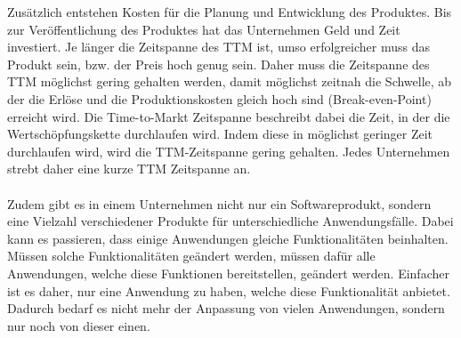 Zusätzlich entstehen Kosten für die Planung und Entwicklung des Produktes. Bis zur Veröffentlichung des Produktes hat das Unternehmen Geld und Zeit investiert. Je länger die Zeitspanne des TTM ist, umso erfolgreicher muss das Produkt sein, bzw. der Preis hoch genug sein. Daher muss die Zeitspanne des TTM möglichst gering gehalten werden, damit möglichst zeitnah die Schwelle, ab der die Erlöse und die Produktionskosten gleich hoch sind (Break-even-Point) erreicht wird. Die Time-to-Markt Zeitspanne beschreibt dabei die Zeit, in der die Wertschöpfungskette durchlaufen wird. Indem diese in möglichst geringer Zeit durchlaufen wird, wird die TTM-Zeitspanne gering gehalten. Jedes Unternehmen strebt daher eine kurze TTM Zeitspanne an.
\\\\
Zudem gibt es in einem Unternehmen nicht nur ein Softwareprodukt, sondern eine Vielzahl verschiedener Produkte für unterschiedliche Anwendungsfälle. Dabei kann es passieren, dass einige Anwendungen gleiche Funktionalitäten beinhalten. Müssen solche Funktionalitäten geändert werden, müssen dafür alle Anwendungen, welche diese Funktionen bereitstellen, geändert werden. Einfacher ist es daher, nur eine Anwendung zu haben, welche diese Funktionalität anbietet. Dadurch bedarf es nicht mehr der Anpassung von vielen Anwendungen, sondern nur noch von dieser einen.

